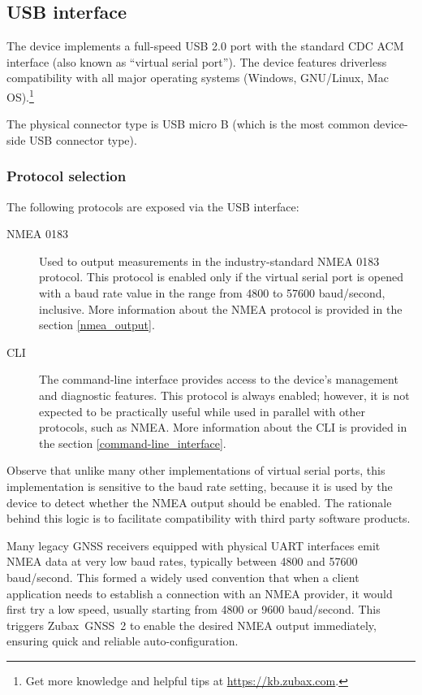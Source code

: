 \documentclass{zubaxdoc}
\begin{document}
\subsection{USB interface}

The device implements a full-speed USB 2.0 port with the standard CDC ACM interface
(also known as ``virtual serial port'').
The device features driverless compatibility with all major operating systems
(Windows, GNU/Linux, Mac OS).\footnote{Get more knowledge and helpful tips at \url{https://kb.zubax.com}.}

The physical connector type is USB micro B (which is the most common device-side USB connector type).

\subsubsection{Protocol selection}\label{sec:usb_protocol_selection}

The following protocols are exposed via the USB interface:
\begin{description}

    \item[NMEA 0183] Used to output measurements in the industry-standard NMEA 0183 protocol.
    This protocol is enabled only if the virtual serial port is opened with a baud rate value in the
    range from 4800 to 57600 baud/second, inclusive.
    More information about the NMEA protocol is provided in the section \ref{nmea_output}.

    \item[CLI] The command-line interface provides access to the device's management and diagnostic
    features. This protocol is always enabled; however, it is not expected to be practically useful
    while used in parallel with other protocols, such as NMEA.
    More information about the CLI is provided in the section \ref{command-line_interface}.

\end{description}

Observe that unlike many other implementations of virtual serial ports,
this implementation is sensitive to the baud rate setting,
because it is used by the device to detect whether the NMEA output should be enabled.
The rationale behind this logic is to facilitate compatibility with third party software products.

Many legacy GNSS receivers equipped with physical UART interfaces emit NMEA data at very low
baud rates, typically between 4800 and 57600 baud/second.
This formed a widely used convention that when a client application needs to establish a connection
with an NMEA provider, it would first try a low speed, usually starting from 4800 or 9600
baud/second.
This triggers Zubax~GNSS~2 to enable the desired NMEA output immediately,
ensuring quick and reliable auto-configuration.
\end{document}
